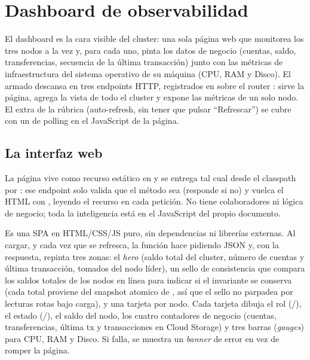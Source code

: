 \section{Dashboard de observabilidad}

El dashboard es la cara visible del cluster: una sola página web que monitorea
los tres nodos a la vez y, para cada uno, pinta los datos de negocio (cuentas,
saldo, transferencias, secuencia de la última transacción) junto con las
métricas de infraestructura del sistema operativo de su máquina (CPU, RAM y
Disco). El armado descansa en tres endpoints HTTP, registrados en
 sobre el router : 
sirve la página,  agrega la vista de todo el cluster y
 expone las métricas de un solo nodo. El extra de la
rúbrica (auto-refresh, sin tener que pulsar ``Refrescar'') se cubre con un
 de polling en el JavaScript de la página.

\subsection{La interfaz web}

La página vive como recurso estático en 
y se entrega tal cual desde el classpath por :
ese endpoint solo valida que el método sea  (responde  si
no) y vuelca el HTML con , leyendo el recurso
 en cada petición. No tiene colaboradores ni lógica de
negocio; toda la inteligencia está en el JavaScript del propio documento.

Es una SPA en HTML/CSS/JS puro, sin dependencias ni librerías externas. Al
cargar, y cada vez que se refresca, la función  hace
 pidiendo JSON y, con la respuesta, repinta tres zonas:
el \emph{hero} (saldo total del cluster, número de cuentas y última transacción,
tomados del nodo líder), un sello de consistencia que compara los saldos totales
de los nodos en línea para indicar si el invariante se conserva (cada total
proviene del snapshot atomico de , así que el sello no
parpadea por lecturas rotas bajo carga), y una tarjeta
por nodo. Cada tarjeta dibuja el rol (/), el estado
(/), el saldo del nodo, los cuatro contadores de
negocio (cuentas, transferencias, última tx y transacciones en Cloud Storage) y
tres barras (\emph{gauges}) para CPU, RAM y Disco. Si  falla, se
muestra un \emph{banner} de error en vez de romper la página.

